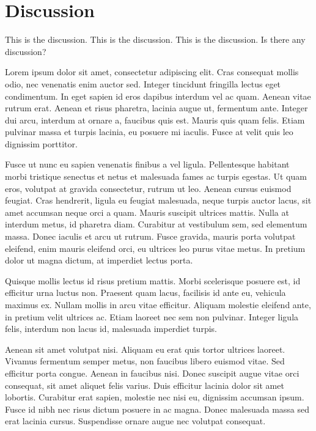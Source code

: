 \documentclass[a4paper]{article}
\begin{document}
\section{Discussion}

This is the discussion. This is the discussion. This is the discussion. Is there any discussion?

Lorem ipsum dolor sit amet, consectetur adipiscing elit. Cras consequat mollis odio, nec venenatis enim auctor sed. Integer tincidunt fringilla lectus eget condimentum. In eget sapien id eros dapibus interdum vel ac quam. Aenean vitae rutrum erat. Aenean et risus pharetra, lacinia augue ut, fermentum ante. Integer dui arcu, interdum at ornare a, faucibus quis est. Mauris quis quam felis. Etiam pulvinar massa et turpis lacinia, eu posuere mi iaculis. Fusce at velit quis leo dignissim porttitor.

Fusce ut nunc eu sapien venenatis finibus a vel ligula. Pellentesque habitant morbi tristique senectus et netus et malesuada fames ac turpis egestas. Ut quam eros, volutpat at gravida consectetur, rutrum ut leo. Aenean cursus euismod feugiat. Cras hendrerit, ligula eu feugiat malesuada, neque turpis auctor lacus, sit amet accumsan neque orci a quam. Mauris suscipit ultrices mattis. Nulla at interdum metus, id pharetra diam. Curabitur at vestibulum sem, sed elementum massa. Donec iaculis et arcu ut rutrum. Fusce gravida, mauris porta volutpat eleifend, enim mauris eleifend orci, eu ultrices leo purus vitae metus. In pretium dolor ut magna dictum, at imperdiet lectus porta.

Quisque mollis lectus id risus pretium mattis. Morbi scelerisque posuere est, id efficitur urna luctus non. Praesent quam lacus, facilisis id ante eu, vehicula maximus ex. Nullam mollis in arcu vitae efficitur. Aliquam molestie eleifend ante, in pretium velit ultrices ac. Etiam laoreet nec sem non pulvinar. Integer ligula felis, interdum non lacus id, malesuada imperdiet turpis.

Aenean sit amet volutpat nisi. Aliquam eu erat quis tortor ultrices laoreet. Vivamus fermentum semper metus, non faucibus libero euismod vitae. Sed efficitur porta congue. Aenean in faucibus nisi. Donec suscipit augue vitae orci consequat, sit amet aliquet felis varius. Duis efficitur lacinia dolor sit amet lobortis. Curabitur erat sapien, molestie nec nisi eu, dignissim accumsan ipsum. Fusce id nibh nec risus dictum posuere in ac magna. Donec malesuada massa sed erat lacinia cursus. Suspendisse ornare augue nec volutpat consequat.
\end{document}
